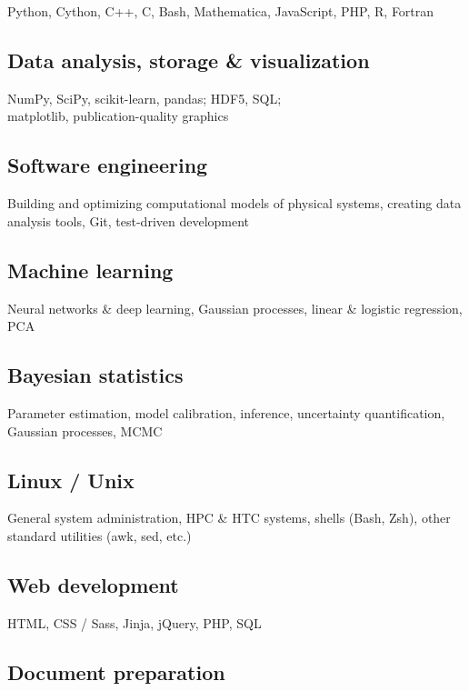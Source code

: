 \documentclass[letterpaper,10pt]{article}
\begin{document}
\begin{multicols}{2}
Python, Cython, C++, C, Bash, Mathematica, JavaScript, PHP, R, Fortran

\subsection{Data analysis, storage \& visualization}

NumPy, SciPy, scikit-learn, pandas; HDF5, SQL; \\
matplotlib, publication-quality graphics

\subsection{Software engineering}

Building and optimizing computational models of physical systems, creating data analysis tools, Git, test-driven development

\subsection{Machine learning}

Neural networks \& deep learning, Gaussian processes, linear \& logistic regression, PCA

\subsection{Bayesian statistics}

Parameter estimation, model calibration, inference, uncertainty quantification, Gaussian processes, MCMC

\subsection{Linux / Unix}

General system administration, HPC \& HTC systems, shells (Bash, Zsh), other standard utilities (awk, sed, etc.)

\subsection{Web development}

HTML, CSS / Sass, Jinja, jQuery, PHP, SQL

\subsection{Document preparation}


\end{multicols}
\end{document}
